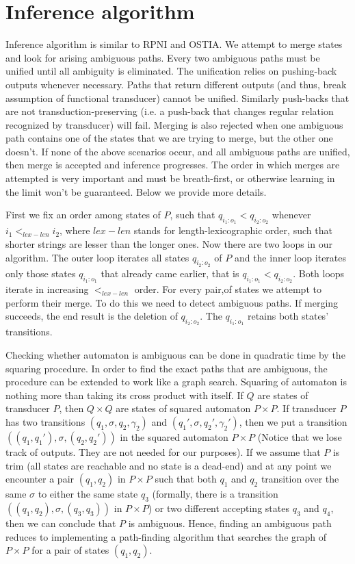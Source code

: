 \section{Inference algorithm}


Inference algorithm is similar to RPNI and OSTIA. We attempt to merge states and look for arising ambiguous paths. Every two ambiguous paths must be unified until all ambiguity is eliminated. The unification relies on pushing-back outputs whenever necessary. Paths that return different outputs (and thus, break assumption of functional transducer) cannot be unified.  Similarly push-backs that are not transduction-preserving (i.e. a push-back that changes regular relation recognized by transducer) will fail. Merging is also rejected when one ambiguous path contains one of the states that we are trying to merge, but the other one doesn't. If none of the above scenarios occur, and all ambiguous paths are unified, then merge is accepted and inference progresses. The order in which merges are attempted is very important and must be breath-first, or otherwise learning in the limit won't be guaranteed. Below we provide more details.


First we fix an order among states of $P$, such that $q_{i_1:o_1}<q_{i_2:o_2}$ whenever $i_1<_{lex-len}i_2$, where $lex-len$ stands for length-lexicographic order, such that shorter strings are lesser than the longer ones. Now there are two loops in our algorithm. The outer loop iterates all states $q_{i_2:o_2}$ of $P$ and the inner loop iterates only those states $q_{i_1:o_1}$ that already came earlier, that is $q_{i_1:o_1}<q_{i_2:o_2}$. Both loops iterate in increasing $<_{lex-len}$ order. For every pair,of states we attempt to perform their merge. To do this we need to detect ambiguous paths. If merging succeeds, the end result is the deletion of $q_{i_2:o_2}$. The $q_{i_1:o_1}$ retains both states' transitions. 

Checking whether automaton is ambiguous can be done in quadratic time by the squaring procedure\cite{Marie-Pierre}. In order to find the exact paths that are ambiguous, the procedure can be extended to work like a graph search. Squaring of automaton is nothing more than taking its cross product with itself. If $Q$ are states of transducer $P$, then $Q\times Q$ are states of squared automaton $P\times P$. If transducer $P$ has two transitions $(q_1,\sigma,q_2,\gamma_2)$ and $(q_1',\sigma,q_2',\gamma_2')$, then we put a transition $((q_1,q_1'),\sigma,(q_2,q_2'))$ in the squared automaton $P\times P$ (Notice that we lose track of outputs. They are not needed for our purposes). If we  assume that $P$ is trim (all states are reachable and no state is a dead-end) and at any point we encounter a pair $(q_1,q_2)$ in $P\times P$ such that both $q_1$ and $q_2$ transition over the same $\sigma$  to either the same state $q_3$ (formally, there is a transition $((q_1,q_2),\sigma,(q_3,q_3))$ in $P\times P$) or two different accepting states $q_3$ and $q_4$, then we can conclude that $P$ is ambiguous. Hence, finding an ambiguous path reduces to implementing a path-finding algorithm that searches the graph of $P\times P$ for a pair of states $(q_1,q_2)$. 

